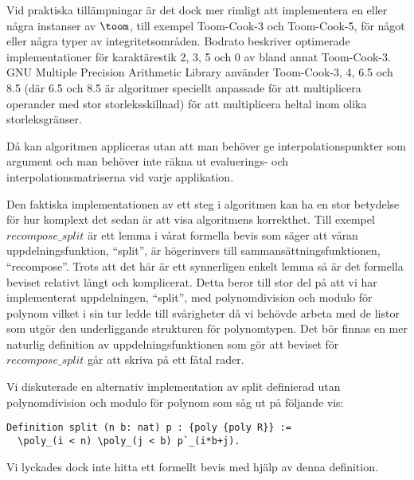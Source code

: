 Vid praktiska tillämpningar är det dock mer rimligt att implementera en eller
några instanser av $\toom$, till exempel Toom-Cook-3 och Toom-Cook-5, för något
eller några typer av
integritetsområden.
Bodrato\cite{bodrato2007a}\cite{bodrato2007towards}\cite{bodrato2007integer}
beskriver optimerade implementationer för karaktärestik 2, 3, 5 och 0 av bland
annat Toom-Cook-3. GNU Multiple Precision Arithmetic Library använder
Toom-Cook-3, 4, 6.5 och 8.5 (där 6.5 och 8.5 är algoritmer speciellt anpassade
för att multiplicera operander med stor storleksskillnad) för att multiplicera
heltal inom olika storleksgränser.

Då kan algoritmen appliceras utan att man behöver ge interpolationspunkter som
argument och man behöver inte räkna ut evaluerings- och
interpolationsmatriserna vid varje applikation.

Den faktiska implementationen av ett steg i algoritmen kan ha en stor betydelse
för hur komplext det sedan är att visa algoritmens korrekthet. Till exempel
$recompose\_split$ är ett lemma i vårat formella bevis som säger att våran
uppdelningsfunktion, ``split'', är högerinvers till sammansättningsfunktionen,
``recompose''. Trots att det här är ett synnerligen enkelt lemma så är det
formella beviset relativt långt och komplicerat. Detta beror till stor del på
att vi har implementerat uppdelningen, ``split'', med polynomdivision och modulo
för polynom vilket i sin tur ledde till svårigheter då vi behövde arbeta med de
listor som utgör den underliggande strukturen för polynomtypen. Det bör finnas
en mer naturlig definition av uppdelningsfunktionen som gör att beviset för
$recompose\_split$ går att skriva på ett fåtal rader.

Vi diskuterade en alternativ implementation av split definierad utan
polynomdivision och modulo för polynom som såg ut på följande vis:
\begin{lstlisting}
Definition split (n b: nat) p : {poly {poly R}} :=
  \poly_(i < n) \poly_(j < b) p`_(i*b+j).
\end{lstlisting}
Vi lyckades dock inte hitta ett formellt bevis med hjälp av denna definition.

